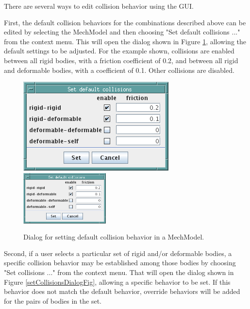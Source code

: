 \documentclass{article}
\begin{document}
There are several ways to edit collision behavior using the GUI.

First, the default collision behaviors for the combinations
described above can be edited by selecting the MechModel
and then choosing {\sf "Set default collisions ..."} from the context
menu. This will open the dialog shown in
Figure \ref{setDefaultCollisionsDialogFig}, allowing the default settings to be
adjusted. For the example shown, collisions are enabled between all rigid
bodies, with a friction coefficient of 0.2, and between all rigid and
deformable bodies, with a coefficient of 0.1. Other collisions
are disabled.

\begin{figure}
\begin{center}
\iflatexml
\includegraphics[]{images/setDefaultCollisionsDialog}
\else
\includegraphics[width=0.40\textwidth]{images/setDefaultCollisionsDialog}
\fi
\end{center}
\caption{Dialog for setting default collision behavior in a MechModel.}%
\label{setDefaultCollisionsDialogFig}
\end{figure}

Second, if a user selects a particular set of rigid and/or deformable
bodies, a specific collision behavior may be established among those
bodies by choosing {\sf "Set collisions ..."} from the context menu.  That
will open the dialog shown in Figure \ref{setCollisionsDialogFig}, allowing a
specific behavior to be set. If this behavior does not match the
default behavior, override behaviors will be added for the pairs of
bodies in the set.
\end{document}
